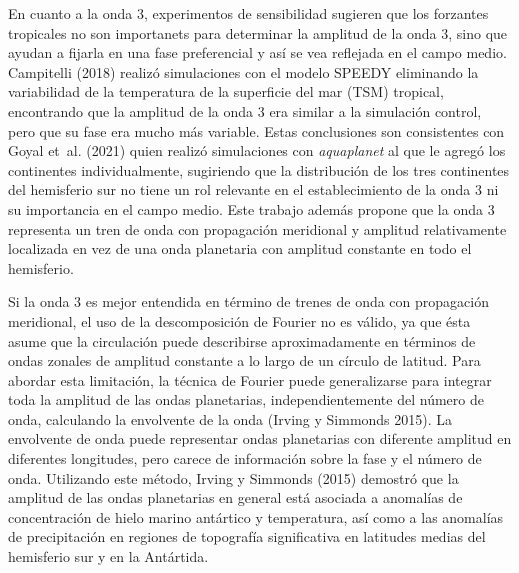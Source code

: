 \documentclass[12pt,oneside,a4paper]{reedthesis}
\begin{document}
En cuanto a la onda 3, experimentos de sensibilidad sugieren que los forzantes tropicales no son importanets para determinar la amplitud de la onda 3, sino que ayudan a fijarla en una fase preferencial y así se vea reflejada en el campo medio.
Campitelli (2018) realizó simulaciones con el modelo SPEEDY eliminando la variabilidad de la temperatura de la superficie del mar (TSM) tropical, encontrando que la amplitud de la onda 3 era similar a la simulación control, pero que su fase era mucho más variable.
Estas conclusiones son consistentes con Goyal et~al. (2021) quien realizó simulaciones con \emph{aquaplanet} al que le agregó los continentes individualmente, sugiriendo que la distribución de los tres continentes del hemisferio sur no tiene un rol relevante en el establecimiento de la onda 3 ni su importancia en el campo medio.
Este trabajo además propone que la onda 3 representa un tren de onda con propagación meridional y amplitud relativamente localizada en vez de una onda planetaria con amplitud constante en todo el hemisferio.

Si la onda 3 es mejor entendida en término de trenes de onda con propagación meridional, el uso de la descomposición de Fourier no es válido, ya que ésta asume que la circulación puede describirse aproximadamente en términos de ondas zonales de amplitud constante a lo largo de un círculo de latitud.
Para abordar esta limitación, la técnica de Fourier puede generalizarse para integrar toda la amplitud de las ondas planetarias, independientemente del número de onda, calculando la envolvente de la onda (Irving y Simmonds 2015).
La envolvente de onda puede representar ondas planetarias con diferente amplitud en diferentes longitudes, pero carece de información sobre la fase y el número de onda.
Utilizando este método, Irving y Simmonds (2015) demostró que la amplitud de las ondas planetarias en general está asociada a anomalías de concentración de hielo marino antártico y temperatura, así como a las anomalías de precipitación en regiones de topografía significativa en latitudes medias del hemisferio sur y en la Antártida.
\end{document}
